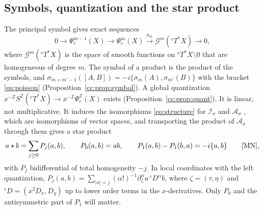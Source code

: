 \documentclass[11pt,oneside,reqno]{article}
\newcommand{\Z}{\mathbb Z}
\newcommand{\Is}{\mathcal I_\sigma}
\newcommand{\As}{\mathcal A_\sigma}
\newcommand{\Psic}{\Psi_{c}}
\newcommand{\cT}{{}^cT^*X}
\theoremstyle{plain}
\theoremstyle{definition}
\theoremstyle{remark}
\begin{document}
\subsection{Symbols, quantization and the star product}\label{subsec:symbols}
The principal symbol gives exact sequences \cite[(11)]{MN}
\[
 0\to\Psic^{m-1}(X)\to\Psic^m(X)\xrightarrow{\sigma_m}
 \mathcal G^m(\cT)\to0,
\]
where \(\mathcal G^m(\cT)\) is the space of smooth functions on
\(\cT\setminus0\) that are homogeneous of degree \(m\). The symbol of a
product is the product of the symbols, and
\(\sigma_{m+m'-1}([A,B])=-i\{\sigma_m(A),\sigma_{m'}(B)\}\) with the
bracket \eqref{eq:poisson} (Proposition~\ref{cc:prop:symbol}). A global
quantization \(x^{-\Z}S^{\Z}(\cT)\to x^{-\Z}\Psic^{\Z}(X)\) exists
\cite[Prop.~24]{MN} (Proposition~\ref{cc:prop:quant}). It is linear, not
multiplicative. It induces the isomorphisms \eqref{eq:structure} for
\(\Is\) and \(\As\) \cite[(13)]{MN}, which are isomorphisms of vector
spaces, and transporting the product of \(\As\) through them gives a star
product
\[
 a\star b=\sum_{j\ge0}P_j(a,b),\qquad P_0(a,b)=ab,\qquad
 P_1(a,b)-P_1(b,a)=-i\{a,b\} \qquad\text{\cite[(137)--(138)]{MN}},
\]
with \(P_j\) bidifferential of total homogeneity \(-j\). In local
coordinates with the left quantization,
\(P_j(a,b)=\sum_{|\alpha|=j}(\alpha!)^{-1}\partial_\zeta^\alpha a\,
{}^cD^\alpha b\), where \(\zeta=(\tau,\eta)\) and \({}^cD=(x^2D_x,D_y)\)
up to lower order terms in the \(x\)-derivatives. Only \(P_0\) and the
antisymmetric part of \(P_1\) will matter.
\end{document}
